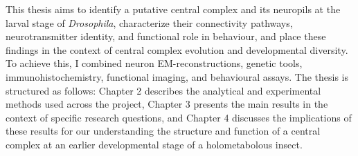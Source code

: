 
    This thesis aims to identify a putative central complex and its neuropils at the larval stage of \textit{Drosophila}, characterize their connectivity pathways, neurotransmitter identity, and functional role in behaviour, and place these findings in the context of central complex evolution and developmental diversity. To achieve this, I combined neuron EM-reconstructions, genetic tools, immunohistochemistry, functional imaging, and behavioural assays. The thesis is structured as follows: Chapter 2 describes the analytical and experimental methods used across the project, Chapter 3 presents the main results in the context of specific research questions, and Chapter 4 discusses the implications of these results for our understanding the structure and function of a central complex at an earlier developmental stage of a holometabolous insect.


